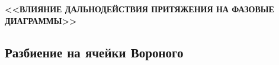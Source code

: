 \documentclass[pdf,hyperref={unicode}]{beamer}
\begin{document}



\begin{frame}
\begin{center}
\vspace{5mm}
\textbf{<<ВЛИЯНИЕ ДАЛЬНОДЕЙСТВИЯ ПРИТЯЖЕНИЯ НА ФАЗОВЫЕ ДИАГРАММЫ>>}
\end{center}
\end{frame}


\subsection{Разбиение на ячейки Вороного}
\end{document}
